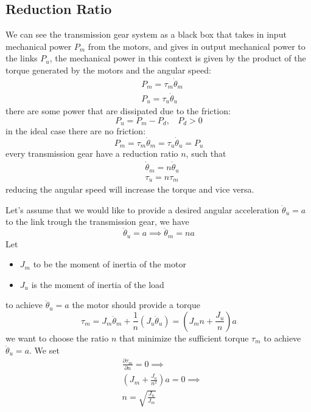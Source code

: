 \documentclass[10pt, letterpaper]{report}
\begin{document}
\subsection{Reduction Ratio}
We can see the transmission gear system as a black box that takes in input mechanical power $P_m$ from the motors, and gives in output mechanical power to the links $P_u$, the mechanical power in this context is given by the product of the torque generated by the motors and the angular speed:\begin{align}
    &P_m=\tau_m\dot\theta_m\\
     &P_u=\tau_u\dot\theta_u
\end{align}
there are some power that are dissipated due to the friction:\begin{equation}
    P_u = P_m-P_d, \ \ \ \ P_d>0
\end{equation}
in the ideal case there are no friction:\begin{equation}
    P_m=\tau_m\dot\theta_m=\tau_u\dot\theta_u=P_u
\end{equation}
every transmission gear have a reduction ratio $n$, such that\begin{align}
    &\dot\theta_m=n\dot\theta_u\\
    &\tau_u=n\tau_m
\end{align}
reducing the angular speed will increase the torque and vice versa.\bigskip 

\noindent 
Let's assume that we would like to provide a desired angular acceleration $\ddot\theta_u=a$ to the link trough the transmission gear, we have $$\ddot\theta_u=a\implies\ddot\theta_m=na$$
Let\begin{itemize}
    \item $J_m$ to be the moment of inertia of the motor 
    \item $J_u$ is the moment of inertia of the load
\end{itemize}
to achieve $\ddot\theta_u=a$ the motor should provide a torque
\begin{equation}
    \tau_m=J_m\ddot{\theta}_m+\frac{1}{n}(J_u\ddot\theta_u)=\left( J_mn+\frac{J_u}{n} \right)a
\end{equation}
we want to choose the ratio $n$ that minimize the sufficient torque $\tau_m$ to achieve $\ddot\theta_u=a$. We set\begin{align}
    &\frac{\partial \tau_m}{\partial n}=0\implies\\ &\left( J_m+\frac{J_u}{n^2} \right)a=0\implies \\ 
    &n=\sqrt{\frac{J_u}{J_m}}
\end{align}
\end{document}
